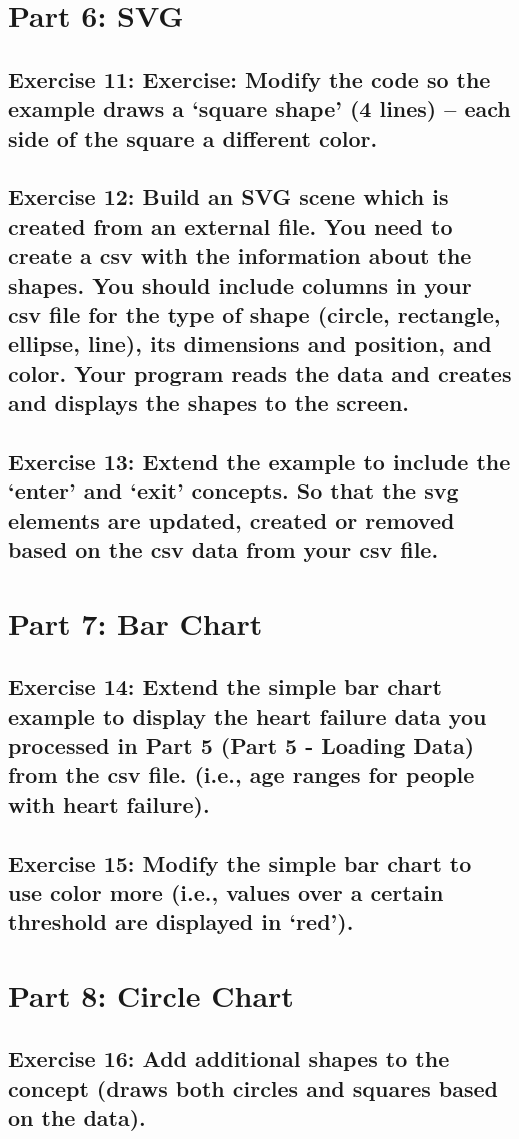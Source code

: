\documentclass[11pt]{article}   	%
\begin{document}
\section{Part 6: SVG}
\subsection{Exercise 11: Exercise: Modify the code so the example draws a ‘square shape’ (4 lines) – each side of the square a different color.}
\subsection{Exercise 12: Build an SVG scene which is created from an external file. You need to create a csv with the information about the shapes. You should include columns in your csv file for the type of shape (circle, rectangle, ellipse, line), its dimensions and position, and color. Your program reads the data and creates and displays the shapes to the screen.}
\subsection{ Exercise 13: Extend the example to include the ‘enter’ and ‘exit’ concepts. So that the svg elements are updated, created or removed based on the csv data from your csv file.}

\section{Part 7: Bar Chart}
\subsection{Exercise 14: Extend the simple bar chart example to display the heart failure data you processed in Part 5 (Part 5 -
Loading Data) from the csv file. (i.e., age ranges for people with heart failure).}
\subsection{Exercise 15: Modify the simple bar chart to use color more (i.e., values over a certain threshold are displayed in ‘red’).}

\section{Part 8: Circle Chart}
\subsection{Exercise 16: Add additional shapes to the concept (draws both circles and squares based on the data).}
\end{document}
